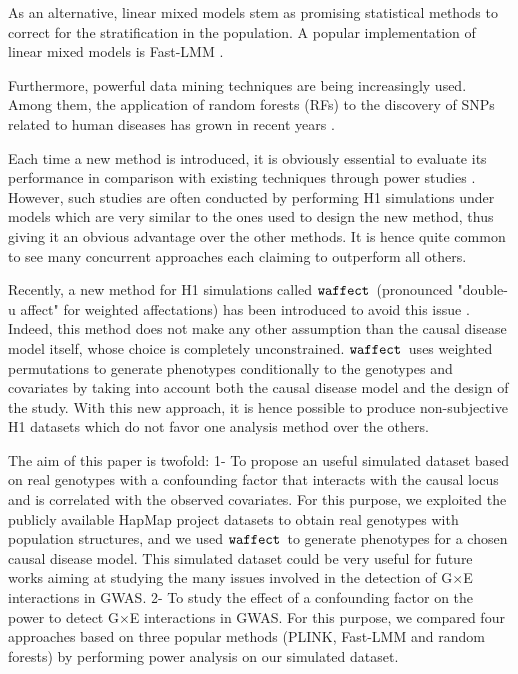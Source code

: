 \documentclass[10pt,a4paper]{article}
\newcommand{\waffect}{${\tt waffect}$\ }
\begin{document}
As an alternative, linear mixed models stem as promising statistical methods to correct for the stratification in the population. A popular implementation of linear mixed models is Fast-LMM \citep{lippert2011fast}.

Furthermore, powerful data mining techniques are being increasingly used. Among them, the application of random forests (RFs) to the discovery of SNPs related to human diseases has grown in recent years \citep{goldstein2010application}. 


\vspace{0.3cm}
Each time a new method is introduced, it is obviously essential to evaluate its performance in comparison with existing techniques through power studies \citep{spencer2009designing}. However, such studies are often conducted by performing H1 simulations under models which are very similar to the ones used to design the new method, thus giving it an obvious advantage over the other methods. It is hence quite common to see many concurrent approaches each claiming to outperform all others.

Recently, a new method for H1 simulations called \waffect (pronounced "double-u affect" for weighted affectations) has been introduced to avoid this issue \citep{perduca2012alternative}. Indeed, this method does not make any other assumption than the causal disease model itself, whose choice is completely unconstrained. \waffect uses weighted permutations to generate phenotypes conditionally to the genotypes and covariates by taking into account both the causal disease model and the design of the study. With this new approach, it is hence possible to produce non-subjective H1 datasets which do not favor one analysis method over the others.

\vspace{0.3cm}
The aim of this paper is twofold: 1- To propose an useful simulated dataset based on real genotypes with a confounding factor that interacts with the causal locus and is correlated with the observed covariates. For this purpose, we exploited the publicly available HapMap project datasets \citep{thorisson2005international} to obtain real genotypes with population structures, and we used \waffect to generate phenotypes for a chosen causal disease model. This simulated dataset could be very useful for future works aiming at studying the many issues involved in the detection of G$\times$E interactions in GWAS. 
2- To study the effect of a confounding factor on the power to detect G$\times$E interactions in GWAS. For this purpose, we compared four approaches based on three popular methods (PLINK, Fast-LMM and random forests) by performing power analysis on our simulated dataset.
\end{document}
